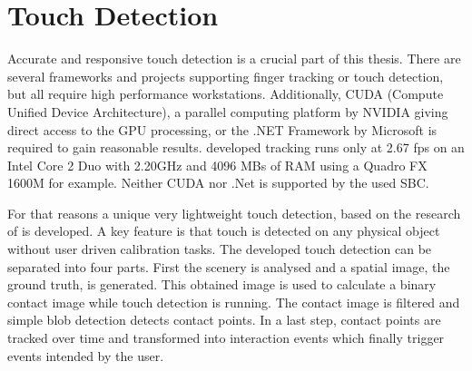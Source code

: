 \section{Touch Detection}
Accurate and responsive touch detection is a crucial part of this thesis. There are several frameworks \cite{FORTHFoundationforResearchTechnologyHellas:F3nqLAGA,Klompmaker:2012id} and projects \cite{Hardy:2012jo,Xiao:2013dp} supporting finger tracking or touch detection, but all require high performance workstations. Additionally, CUDA (Compute Unified Device Architecture), a parallel computing platform by NVIDIA giving direct access to the GPU processing, or the .NET Framework by Microsoft is required to gain reasonable results. \textcite{FORTHFoundationforResearchTechnologyHellas:F3nqLAGA} developed tracking runs only at 2.67 \ac{fps} on an Intel Core 2 Duo with 2.20GHz and 4096 MBs of RAM using a Quadro FX 1600M for example. Neither CUDA nor .Net is supported by the used SBC. 

For that reasons a unique very lightweight touch detection, based on the research of \textcite{Wilson:2010bv} is developed. A key feature is that touch is detected on any physical object without user driven calibration tasks. 
The developed touch detection can be separated into four parts. First the scenery is analysed and a spatial image, the ground truth, is generated. This obtained image is used to calculate a binary contact image while touch detection is running. The contact image is filtered and simple blob detection detects contact points. In a last step, contact points are tracked over time and transformed into interaction events which finally trigger events intended by the user. 


